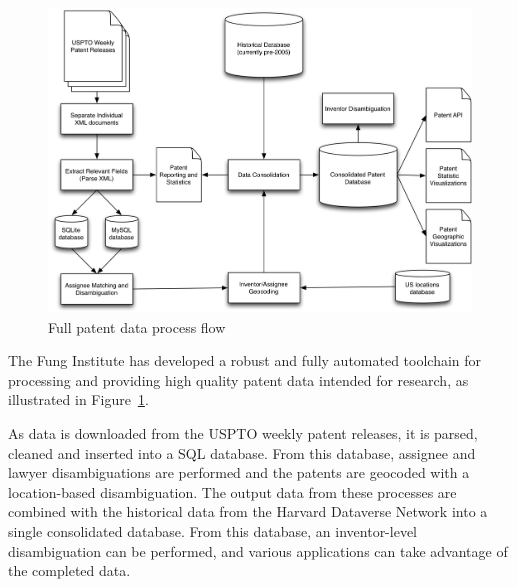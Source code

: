 \begin{figure}
\center
\includegraphics[width=.8\textwidth]{figs/dataprocess}
\caption{Full patent data process flow}
\label{fig:dataprocess}
\end{figure}

The Fung Institute has developed a robust and fully automated toolchain for processing and providing high quality patent data intended for research, as illustrated in Figure~\ref{fig:dataprocess}.

As data is downloaded from the USPTO weekly patent releases, it is parsed, cleaned and inserted into a SQL database. From this database, assignee and lawyer disambiguations are performed and the patents are geocoded with a location-based disambiguation. The output data from these processes are combined with the historical data from the Harvard Dataverse Network into a single consolidated database. From this database, an inventor-level disambiguation can be performed, and various applications can take advantage of the completed data.
